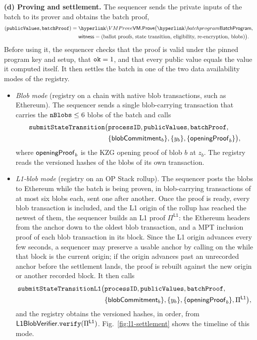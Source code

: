 \noi \textbf{(d) Proving and settlement.}
\label{sec:vocdoni-protocol:flow:settlement}
The sequencer sends the private inputs of the batch to its prover and obtains the batch proof,
\begin{align*}
	(\publicvalues, \batchproof) = {} & \hlget{\VMProve}\bigl(\hlget{\batchprogram},\\ & \witness = (\text{ballot proofs, state transition, eligibility, re-encryption, blobs})\bigr).
\end{align*}
Before using it, the sequencer checks that the proof is valid under the pinned program key and setup, that $\texttt{ok} = 1$, and that every public value equals the value it computed itself. It then settles the batch in one of the two data availability modes of the registry.

\begin{itemize}
	\item \emph{Blob mode} (registry on a chain with native blob transactions, such as Ethereum). The sequencer sends a single blob-carrying transaction that carries the $\texttt{nBlobs} \le 6$ blobs of the batch and calls
	\begin{align*} \texttt{submitStateTransition}\bigl(&\texttt{processID}, \texttt{publicValues}, \texttt{batchProof},\\ &\{{\sf{blobCommitment}}_b\}, \{y_b\}, \{{\sf{openingProof}}_b\}\bigr), \end{align*}
	where ${\sf{openingProof}}_b$ is the \ac{KZG} opening proof of blob $b$ at $z_b$.
	The registry reads the versioned hashes of the blobs of its own transaction.
	\item \emph{L1-blob mode} (registry on an OP Stack rollup). The sequencer posts the blobs to Ethereum while the batch is being proven, in blob-carrying transactions of at most six blobs each, sent one after another. Once the proof is ready, every blob transaction is included, and the L1 origin of the rollup has reached the newest of them, the sequencer builds an L1 proof $\Pi^{\mathsf{L1}}$: the Ethereum headers from the anchor down to the oldest blob transaction, and a \ac{MPT} inclusion proof of each blob transaction in its block. Since the L1 origin advances every few seconds, a sequencer may preserve a usable anchor by calling  on the \lblobverifier while that block is the current origin; if the origin advances past an unrecorded anchor before the settlement lands, the proof is rebuilt against the new origin or another recorded block. It then calls
	\begin{align*} \texttt{submitStateTransitionL1}\bigl(&\texttt{processID}, \texttt{publicValues}, \texttt{batchProof},\\ &\{{\sf{blobCommitment}}_b\}, \{y_b\}, \{{\sf{openingProof}}_b\}, \Pi^{\mathsf{L1}}\bigr), \end{align*}
	and the registry obtains the versioned hashes, in order, from ${\sf{L1BlobVerifier}}.\texttt{verify}(\Pi^{\mathsf{L1}})$. Fig.~\ref{fig:l1-settlement} shows the timeline of this mode.
\end{itemize}
